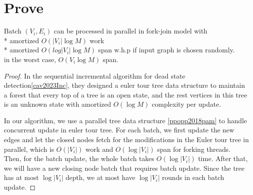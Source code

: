\section{Prove}
\begin{theorem}
    Batch $(V_i, E_i)$ can be processed in parallel in 
    fork-join model with \\
    
    * amortized $O(|V_i|\log M)$ work \\ 

    * amortized $O(log|V_i|\log M)$ span w.h.p if input graph is chosen randomly. \\

    in the worst case, $O(V_i\log M)$ span.
\end{theorem}

\begin{proof}
    In the sequential incremental algorithm for dead state detection\ref{cav2023Inc},
    they designed a euler tour tree data structure to maintain a forest that every top of a tree
    is an open state, and the rest vertices in this tree is an unknown state with amortized $O(\log M)$ 
    complexity per update.

    In our algorithm, we use a parallel tree data structure \ref{ppopp2018pam}
    to handle concurrent update in euler tour tree. For each batch, we first update
    the new edges and let the closed nodes fetch for the modifications in the Euler tour tree
    in parallel, which is $O(|V_i|)$ work and $O(\log |V_i|)$ span for forking
    threads. Then, for the batch update, the whole batch takes $O(\log|V_i|)$ time.
    After that, we will have a new closing node batch that requires batch update.
    Since the tree has at most $\log|V_i|$ depth, we at most have $\log|V_i|$ rounds in each batch update.
    
\end{proof}
